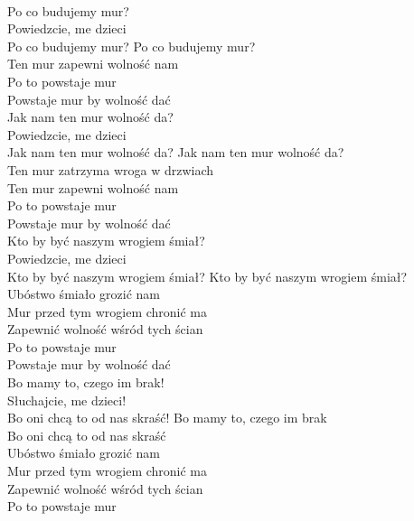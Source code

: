 
\\
Po co budujemy mur? \\
Powiedzcie, me dzieci \\
Po co budujemy mur? 
\hops
{} Po co budujemy mur? \tab{}\\
 Ten mur zapewni wolność nam \\
 Po to powstaje mur \tab{}\\
 Powstaje mur by wolność dać 
\hops
{}\\
Jak nam ten mur wolność da?\\
Powiedzcie, me dzieci\\
Jak nam ten mur wolność da?
\hops
{} Jak nam ten mur wolność da?\\
 Ten mur zatrzyma wroga w drzwiach\\
 Ten mur zapewni wolność nam\\
 Po to powstaje mur\\
 Powstaje mur by wolność dać
\hops
{}\\
Kto by być naszym wrogiem śmiał?\\
Powiedzcie, me dzieci\\
Kto by być naszym wrogiem śmiał?
\hops
{} Kto by być naszym wrogiem śmiał?\\
 Ubóstwo śmiało grozić nam\\
 Mur przed tym wrogiem chronić ma\\
 Zapewnić wolność wśród tych ścian\\
 Po to powstaje mur\\
 Powstaje mur by wolność dać
\hops
{}\\
Bo mamy to, czego im brak!\\
Słuchajcie, me dzieci!\\
Bo oni chcą to od nas skraść!
\hops
{} Bo mamy to, czego im brak\\
 Bo oni chcą to od nas skraść\\
 Ubóstwo śmiało grozić nam\\
 Mur przed tym wrogiem chronić ma\\
 Zapewnić wolność wśród tych ścian\\
 Po to powstaje mur\\
